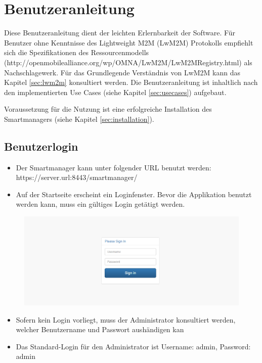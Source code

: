 \chapter{Benutzeranleitung}
Diese Benutzeranleitung dient der leichten Erlernbarkeit der Software. Für Benutzer ohne Kenntnisse des Lightweight M2M (LwM2M) Protokolls empfiehlt sich die Spezifikationen des Ressourcenmodells (http://openmobilealliance.org/wp/OMNA/LwM2M/LwM2MRegistry.html) als Nachschlagewerk. Für das Grundlegende Verständnis von LwM2M kann das Kapitel \ref{sec:lwm2m} konsultiert werden. Die Benutzeranleitung ist inhaltlich nach den implementierten Use Cases (siehe Kapitel \ref{sec:usecases}) aufgebaut.

Voraussetzung für die Nutzung ist eine erfolgreiche Installation des Smartmanagers (siehe Kapitel \ref{sec:installation}). 

\section{Benutzerlogin}
\begin{itemize}
\item Der Smartmanager kann unter folgender URL benutzt werden: https://server.url:8443/smartmanager/
\item Auf der Startseite erscheint ein Loginfenster. Bevor die Applikation benutzt werden kann, muss ein gültiges Login getätigt werden.
\end{itemize}

\begin{figure}[H]
\includegraphics[scale=0.57]{../05_Schlussbericht/images/benutzeranleitung/login.png}
\end{figure}
\begin{itemize}
\item Sofern kein Login vorliegt, muss der Administrator konsultiert werden, welcher Benutzername und Passwort aushändigen kan
\item Das Standard-Login für den Administrator ist Username: admin, Password: admin
\end{itemize}

